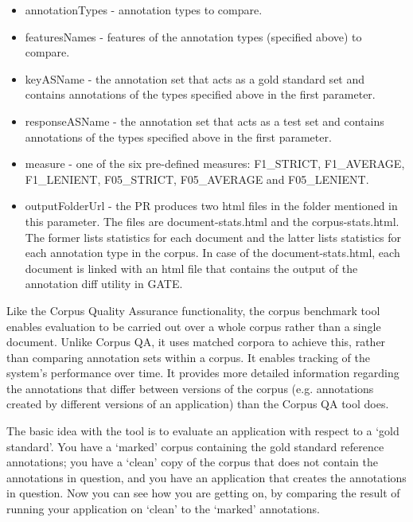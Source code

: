 \begin{itemize}
\item annotationTypes - annotation types to compare.
\item featuresNames - features of the annotation types (specified above) to 
compare.
\item keyASName - the annotation set that acts as a gold standard set and 
contains annotations of the types specified above in the first parameter.
\item responseASName - the annotation set that acts as a test set and contains 
annotations of the types specified above in the first parameter.
\item measure - one of the six pre-defined measures: F1\_STRICT, F1\_AVERAGE,
F1\_LENIENT, F05\_STRICT, F05\_AVERAGE and F05\_LENIENT.
\item outputFolderUrl - the PR produces two html files in the folder mentioned 
in this parameter.  The files are document-stats.html and the corpus-stats.html.
The former lists statistics for each document and the latter lists statistics 
for each annotation type in the corpus. In case of the document-stats.html, each
document is linked with an html file that contains the output of the
annotation diff utility in GATE.
\end{itemize}
%

Like the Corpus Quality Assurance functionality, the corpus benchmark tool
 enables evaluation to be carried out over a whole corpus rather than a
single document. Unlike Corpus QA, it uses matched corpora to achieve this,
rather than comparing annotation sets within a corpus. It enables tracking of the
system's performance over time. It provides more detailed information regarding
the annotations that differ between versions of the corpus (e.g. annotations
created by different versions of an application) than the Corpus QA tool does.

The basic idea with the tool is to evaluate an application with respect to a
`gold standard'. You have a `marked' corpus containing the gold standard
reference annotations; you have a `clean' copy of the corpus that does not
contain the annotations in question, and you have an application that creates the
annotations in question. Now you can see how you are getting on, by comparing the
result of running your application on `clean' to the `marked' annotations.

